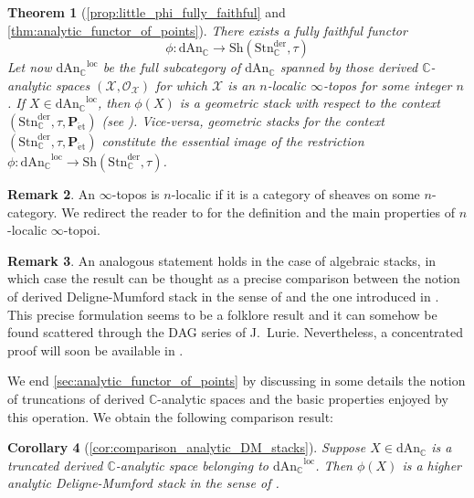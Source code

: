 \documentclass[12pt,a4paper,reqno]{amsart}
\theoremstyle{plain}
\newtheorem{thm-intro}{Theorem}
\newtheorem{cor-intro}[thm-intro]{Corollary}
\theoremstyle{definition}
\newtheorem{rem-intro}[thm-intro]{Remark}
\theoremstyle{remark}
\numberwithin{equation}{section}
\begin{document}
\begin{thm-intro}[{\cref{prop:little_phi_fully_faithful} and \cref{thm:analytic_functor_of_points}}] \label{thm_intro_comparison_DM_stacks}
	There exists a fully faithful functor
	\[ \phi \colon {\mathrm{dAn}_{\mathbb C}} \to {\mathrm{Sh}}({\mathrm{Stn}^{\mathrm{der}}_{\mathbb C}}, \tau) \]
	Let now ${\mathrm{dAn}_{\mathbb C}}^{\mathrm{loc}}$ be the full subcategory of ${\mathrm{dAn}_{\mathbb C}}$ spanned by those derived {$\mathbb C$-analytic\xspace} spaces $({\mathcal X}, {\mathcal O}_{\mathcal X})$ for which ${\mathcal X}$ is an $n$-localic $\infty$-topos for some integer $n$.
	If $X \in {\mathrm{dAn}_{\mathbb C}}^{\mathrm{loc}}$, then $\phi(X)$ is a geometric stack with respect to the context $({\mathrm{Stn}^{\mathrm{der}}_{\mathbb C}}, \tau, {\mathbf P}_{\mathrm{\acute{e}t}})$ (see \cite[Definitions 2.11 and 2.15]{Porta_Yu_Higher_analytic_stacks_2014}). Vice-versa, geometric stacks for the context $({\mathrm{Stn}^{\mathrm{der}}_{\mathbb C}}, \tau, {\mathbf P}_{\mathrm{\acute{e}t}})$ constitute the essential image of the restriction $\phi \colon {\mathrm{dAn}_{\mathbb C}}^{\mathrm{loc}} \to {\mathrm{Sh}}({\mathrm{Stn}^{\mathrm{der}}_{\mathbb C}}, \tau)$.
\end{thm-intro}

\begin{rem-intro}
	An $\infty$-topos is $n$-localic if it is a category of sheaves on some $n$-category.
	We redirect the reader to \cite[Â§ 6.4.5]{HTT} for the definition and the main properties of $n$-localic $\infty$-topoi.
\end{rem-intro}

\begin{rem-intro}
	An analogous statement holds in the case of algebraic stacks, in which case the result can be thought as a precise comparison between the notion of derived {Deligne-Mumford\xspace} stack in the sense of \cite{HAG-II} and the one introduced in \cite{DAG-V}. This precise formulation seems to be a folklore result and it can somehow be found scattered through the DAG series of J.\ Lurie. Nevertheless, a concentrated proof will soon be available in \cite{Porta_Comparison_2015}.
\end{rem-intro}

We end \cref{sec:analytic_functor_of_points} by discussing in some details the notion of truncations of derived {$\mathbb C$-analytic\xspace} spaces and the basic properties enjoyed by this operation. We obtain the following comparison result:

\begin{cor-intro}[{\cref{cor:comparison_analytic_DM_stacks}}]
	Suppose $X \in {\mathrm{dAn}_{\mathbb C}}$ is a truncated derived {$\mathbb C$-analytic\xspace} space belonging to ${\mathrm{dAn}_{\mathbb C}}^{\mathrm{loc}}$.
	Then $\phi(X)$ is a higher analytic {Deligne-Mumford\xspace} stack in the sense of \cite{Porta_Yu_Higher_analytic_stacks_2014}.
\end{cor-intro}
\end{document}
